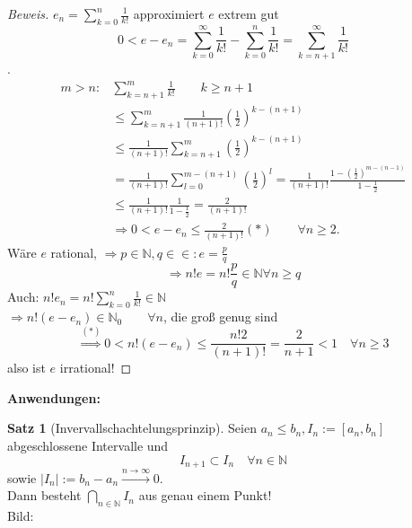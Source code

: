 \documentclass[12pt,a4paper,titlepage]{article} %
\theoremstyle{definition}
\newtheorem{satz}{Satz}[subsection]
\theoremstyle{remark}
\newenvironment{bew}{\begin{proof}[Beweis]}{\end{proof}}
\newcommand{\N}{\mathbb{N}}
\begin{document}
\begin{bew}
	\(e_n = \sum_{k=0}^{n} \frac{1}{k!} \) approximiert \(e\) extrem gut\\
	\[ 0< e-e_n = \sum_{k=0}^{\infty} \frac{1}{k!} - \sum_{k=0}^{n} \frac{1}{k!} = \sum_{k=n+1}^{\infty} \frac{1}{k!} \].
	\begin{align*}
		m>n: &\sum_{k=n+1}^{m} \frac{1}{k!} \qquad k \geq n+1\\
		&\leq \sum_{k=n+1}^{m} \frac{1}{(n+1)!} \left(\frac{1}{2}\right)^{k-(n+1)}\\
		&\leq \frac{1}{(n+1)!} \sum_{k=n+1}^{m} \left(\frac{1}{2}\right)^{k-(n+1)}\\
		&= \frac{1}{(n+1)!} \sum_{l=0}^{m-(n+1)} (\frac{1}{2})^l = \frac{1}{(n+1)!} \frac{1-(\frac{1}{2})^{m-(n-1)}}{1-\frac{1}{2}}\\
		&\leq \frac{1}{(n+1)!} \frac{1}{1-\frac{1}{2}} = \frac{2}{(n+1)!}\\
		&\Rightarrow 0 < e - e_n \leq \frac{2}{(n+1)!} (*) \qquad\forall n\geq 2.
	\end{align*}
	Wäre \(e\) rational, \(\Rightarrow p\in\N,q\in\in:e=\frac{p}{q} \)
	\[ \Rightarrow n! e = n! \frac{p}{q} \in\N \forall n\geq q \]
	Auch: \( n! e_n = n! \sum_{k=0}^{n} \frac{1}{k!} \in\N \)\\
	\( \Rightarrow n!(e-e_n) \in\N_0 \qquad \forall n \), die groß genug sind
	\[ \overset{(*)}{\Rightarrow} 0<n!(e-e_n) \leq \frac{n!2}{(n+1)!} = \frac{2}{n+1} < 1 \quad \forall n\geq 3 \]
	\Lightning also ist \(e\) irrational!
\end{bew}
\textbf{Anwendungen:}
\begin{satz}[Invervallschachtelungsprinzip]
	Seien \( a_n\leq b_n, I_n := [a_n,b_n] \) abgeschlossene Intervalle und \[I_{n+1} \subset I_n \quad \forall n\in\N\]
	sowie \( |I_n| := b_n - a_n \overset{n\rightarrow\infty}{\rightarrow} 0 \).\\
	Dann besteht \(\bigcap_{n\in\N} I_n\) aus genau einem Punkt!\\
	Bild: 
	\begin{center}
	\end{center}
\end{satz}
\end{document}
